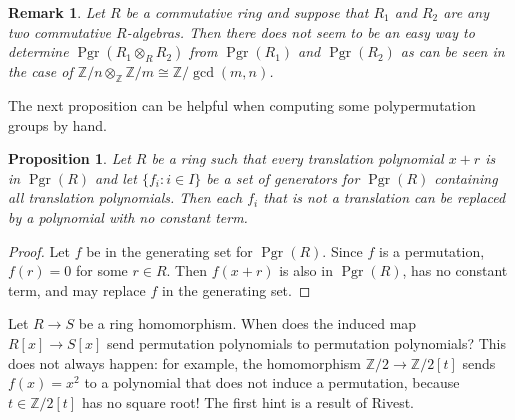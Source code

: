 \documentclass[oneside]{amsart}
\theoremstyle{nthm}
\newtheorem{prop}[subsection]{Proposition}
\theoremstyle{ndef}
\theoremstyle{nrem}
\newtheorem{rem}[subsection]{Remark}
\newcommand{\Z}{\mathbb{Z}}
\DeclareMathOperator{\Pgr}{Pgr}
\begin{document}
\begin{rem}Let $R$ be a commutative ring and suppose that $R_1$ and $R_2$ are any two commutative $R$-algebras. Then there does not seem to be an easy way to determine $\Pgr(R_1\otimes_R R_2)$ from $\Pgr(R_1)$ and $\Pgr(R_2)$ as can be seen in the case of $\Z/n\otimes_\Z\Z/m\cong \Z/\gcd(m,n)$.\end{rem}
    The next proposition can be helpful when computing some polypermutation groups by hand.
\begin{prop}\label{thm:noConstantGenerator}
    Let $R$ be a ring such that every translation polynomial $x + r$ is in $\Pgr(R)$ and let $\{ f_i : i\in I\}$ be a set of generators for $\Pgr(R)$ containing all translation polynomials. Then each $f_i$ that is not a translation can be replaced by a polynomial with no constant term.
\end{prop}
\begin{proof}
    Let $f$ be in the generating set for $\Pgr(R)$. Since $f$ is a permutation, $f(r) = 0$ for some $r\in R$. Then $f(x + r)$ is also in $\Pgr(R)$, has no constant term, and may replace $f$ in the generating set.
\end{proof}

Let $R\to S$ be a ring homomorphism. When does the induced map $R[x]\to S[x]$ send permutation polynomials to permutation polynomials? This does not always happen: for example, the homomorphism $\Z/2\to \Z/2[t]$ sends $f(x) = x^2$ to a polynomial that does not induce a permutation, because $t\in \Z/2[t]$ has no square root! The first hint is a result of Rivest.
\end{document}
